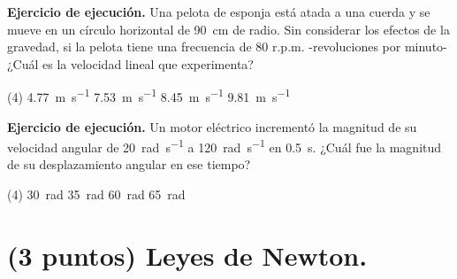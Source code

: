 \documentclass[12pt, letter]{exam}
\begin{document}
\begin{questions}
    \question \label{Ejercicio_08} \textbf{Ejercicio de ejecución.} Una pelota de esponja está atada a una cuerda y se mueve en un círculo horizontal de \SI{90}{\centi\meter} de radio. Sin considerar los efectos de la gravedad, si la pelota tiene una frecuencia de \num{80} r.p.m. -revoluciones por minuto- ¿Cuál es la velocidad lineal que experimenta?
    \begin{tasks}(4)
        \task \SI{4.77}{\meter\per\second}
        \task \SI{7.53}{\meter\per\second}
        \task \SI{8.45}{\meter\per\second}
        \task \SI{9.81}{\meter\per\second}
    \end{tasks}
    \question \label{Ejercicio_09} \textbf{Ejercicio de ejecución.} Un motor eléctrico incrementó la magnitud de su velocidad angular de \SI{20}{\radian\per\second} a \SI{120}{\radian\per\second} en \SI{0.5}{\second}. ¿Cuál fue la magnitud de su desplazamiento angular en ese tiempo?
    \begin{tasks}(4)
        \task \SI{30}{\radian}
        \task \SI{35}{\radian}
        \task \SI{60}{\radian}
        \task \SI{65}{\radian}
    \end{tasks}

    
    \section{(3 puntos) Leyes de Newton.}

    
    

\end{questions}
\end{document}
